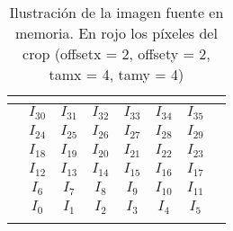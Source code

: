 \begin{table}[h]
\centering
\mem
\begin{tabular}{l|c|c|c|c|c|c|l}
 & \multicolumn{1}{l|}{}      & \multicolumn{1}{l|}{}       & \multicolumn{1}{l|}{}       & \multicolumn{1}{l|}{}       & \multicolumn{1}{l|}{}       & \multicolumn{1}{l|}{}      &  \\ \hline
 & \cellcolor[HTML]{FFCB2F}$I_{30}$ & \cellcolor[HTML]{FFCB2F}$I_{31}$  & \cellcolor[HTML]{FD6864}$I_{32}$  & \cellcolor[HTML]{FD6864}$I_{33}$  & \cellcolor[HTML]{FD6864}$I_{34}$  & \cellcolor[HTML]{FD6864}$I_{35}$ &  \\ \hline
 & \cellcolor[HTML]{FFCB2F}$I_{24}$ & \cellcolor[HTML]{FFCB2F}$I_{25}$  & \cellcolor[HTML]{FD6864}$I_{26}$  & \cellcolor[HTML]{FD6864}$I_{27}$  & \cellcolor[HTML]{FD6864}$I_{28}$  & \cellcolor[HTML]{FD6864}$I_{29}$ &  \\ \hline
 & \cellcolor[HTML]{FFCB2F}$I_{18}$ & \cellcolor[HTML]{FFCB2F}$I_{19}$ & \cellcolor[HTML]{FD6864}$I_{20}$ & \cellcolor[HTML]{FD6864}$I_{21}$ & \cellcolor[HTML]{FD6864}$I_{22}$  & \cellcolor[HTML]{FD6864}$I_{23}$ &  \\ \hline
 & \cellcolor[HTML]{FFCB2F}$I_{12}$ & \cellcolor[HTML]{FFCB2F}$I_{13}$ & \cellcolor[HTML]{FD6864}$I_{14}$ & \cellcolor[HTML]{FD6864}$I_{15}$ & \cellcolor[HTML]{FD6864}$I_{16}$  & \cellcolor[HTML]{FD6864}$I_{17}$ &  \\ \hline
 & \cellcolor[HTML]{FFCB2F}$I_{6}$ & \cellcolor[HTML]{FFCB2F}$I_{7}$ & \cellcolor[HTML]{FFCB2F}$I_{8}$ & \cellcolor[HTML]{FFCB2F}$I_{9}$ & \cellcolor[HTML]{FFCB2F}$I_{10}$  & \cellcolor[HTML]{FFCB2F}$I_{11}$ &  \\ \hline
 & \cellcolor[HTML]{FFCB2F}$I_{0}$ & \cellcolor[HTML]{FFCB2F}$I_{1}$ & \cellcolor[HTML]{FFCB2F}$I_{2}$ & \cellcolor[HTML]{FFCB2F}$I_{3}$ & \cellcolor[HTML]{FFCB2F}$I_{4}$  & \cellcolor[HTML]{FFCB2F}$I_{5}$ &  \\ \hline
 & \multicolumn{1}{l|}{}      & \multicolumn{1}{l|}{}       & \multicolumn{1}{l|}{}       & \multicolumn{1}{l|}{}       & \multicolumn{1}{l|}{}       & \multicolumn{1}{l|}{}      &
\end{tabular}
\caption{Ilustración de la imagen fuente en memoria. En rojo los píxeles del crop \newline
(offsetx = 2, offsety = 2, tamx = 4, tamy = 4)}
\end{table}

